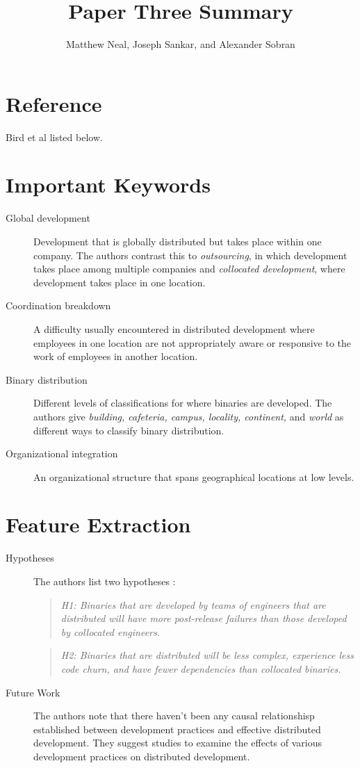 \documentclass[english]{article}
\begin{document}
\title{Paper Three Summary}


\author{Matthew Neal, Joseph Sankar, and Alexander Sobran}

\maketitle

\section*{Reference}

Bird et al \cite{bird09} listed below.


\section*{Important Keywords}
\begin{description}
\item [{Global development}] Development that is globally distributed but takes place within one company. The authors contrast this to \emph{outsourcing}, in which development takes place among multiple companies and \emph{collocated development}, where development takes place in one location. 
\item [{Coordination breakdown}] A difficulty usually encountered in distributed development where employees in one location are not appropriately aware or responsive to the work of employees in another location.
\item [{Binary distribution}] Different levels of classifications for where binaries are developed. The authors give \emph{building, cafeteria, campus, locality, continent, } and \emph{world} as different ways to classify binary distribution.
\item [{Organizational integration}] An organizational structure that spans geographical locations at low levels.
\end{description}

\section*{Feature Extraction}
\begin{description}
\item[Hypotheses] The authors list two hypotheses \cite{bird09}: 
\begin{quote}
\emph{H1: Binaries that are developed by teams of engineers that are distributed will have more post-release failures than those developed by collocated engineers.}
\end{quote}
\begin{quote}
\emph{H2: Binaries that are distributed will be less complex, experience less code churn, and have fewer dependencies than collocated binaries.}
\end{quote}
\item[Future Work] The authors note that there haven't been any causal relationshisp established between development practices and effective distributed development. They suggest studies to examine the effects of various development practices on distributed development.
\end{description}
\end{document}
